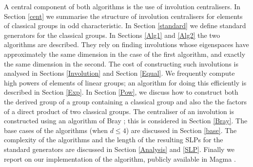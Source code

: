 \documentclass[12pt]{article}
\begin{document}
A central component of both algorithms
is the use of involution centralisers.
In Section \ref{cent} we summarise
the structure of involution centralisers
for elements of classical groups in odd characteristic.
In Section \ref{standard} we define
standard generators for the classical groups.
In Sections \ref{Alg1} and \ref{Alg2} the two 
algorithms are described. They
rely on finding involutions  whose eigenspaces  have
approximately the same  dimension in the case of the first algorithm,
and exactly the same dimension  in the second. The cost 
of constructing such involutions 
is analysed in Sections \ref{Involution} and Section \ref{Equal}.
We frequently compute high powers of elements of linear groups; 
an algorithm for doing this
efficiently is described in Section \ref{Exp}. 
In Section \ref{Pow}, we discuss how to  
construct both the derived group of a group 
containing a classical group and also the 
the factors of a direct product of two classical groups. 
The centraliser of an involution  is constructed using an 
algorithm of Bray \cite{Bray}; this is considered
in Section \ref{Bray}. The base cases of the
algorithms (when $d \leq 4$) are discussed in Section \ref{base}. 
The complexity of the algorithms and the 
length of the resulting SLPs for the standard generators
are discussed in Section \ref{Analysis} and \ref{SLP}.  
Finally we report on our implementation of the algorithm, 
publicly available in {\sc Magma} \cite{Magma}.
\end{document}
